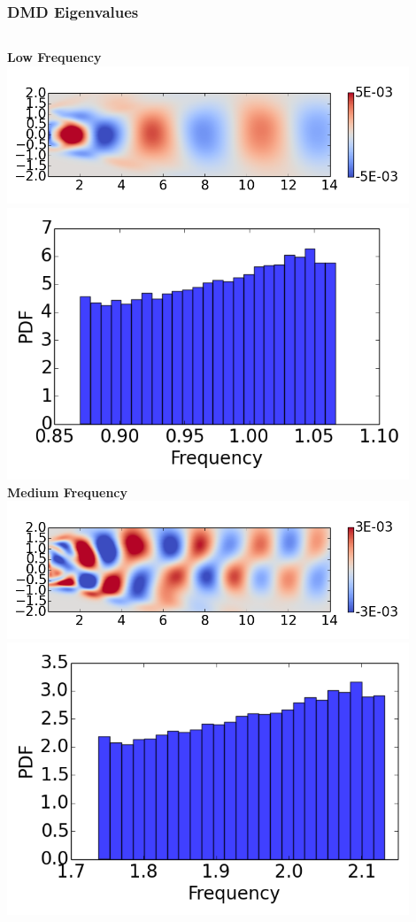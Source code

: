 \documentclass[9pt]{beamer}
\begin{document}
\begin{frame}
\frametitle{DMD Eigenvalues}
\label{sec-3-5}

\begin{columns}[c]
   \centering
    \textbf{Low Frequency} \\
    \includegraphics[width=0.9\textwidth]{DMDMode1} \\
    \includegraphics[width=0.9\textwidth]{PerturbDMDEigSlowPDF}
   \centering
    \textbf{Medium Frequency} \\
    \includegraphics[width=0.9\textwidth]{DMDMode2} \\
    \includegraphics[width=0.9\textwidth]{PerturbDMDEigMediumPDF}

\end{columns}
\end{frame}
\end{document}
